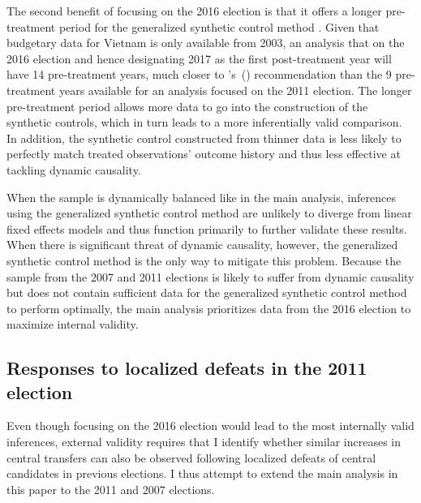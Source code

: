 \documentclass[12pt]{article}
\newcommand\citepos[1]{\citeauthor{#1}'s\ (\citeyear{#1})}
\newcommand{\1}{\mathbbm{1}}
\begin{document}
The second benefit of focusing on the 2016 election is that it offers a longer pre-treatment period for the generalized synthetic control method \citep{Xu2017gsynth}. Given that budgetary data for Vietnam is only available from 2003, an analysis that on the 2016 election and hence designating 2017 as the first post-treatment year will have 14 pre-treatment years, much closer to \citepos{Abadie2010} recommendation than the 9 pre-treatment years available for an analysis focused on the 2011 election. The longer pre-treatment period allows more data to go into the construction of the synthetic controls, which in turn leads to a more inferentially valid comparison. In addition, the synthetic control constructed from thinner data is less likely to perfectly match treated observations' outcome history and thus less effective at tackling dynamic causality.

When the sample is dynamically balanced like in the main analysis, inferences using the generalized synthetic control method are unlikely to diverge from linear fixed effects models and thus function primarily to further validate these results. When there is significant threat of dynamic causality, however, the generalized synthetic control method is the only way to mitigate this problem. Because the sample from the 2007 and 2011 elections is likely to suffer from dynamic causality but does not contain sufficient data for the generalized synthetic control method to perform optimally, the main analysis prioritizes data from the 2016 election to maximize internal validity.

\subsection{Responses to localized defeats in the 2011 election}

Even though focusing on the 2016 election would lead to the most internally valid inferences, external validity requires that I identify whether similar increases in central transfers can also be observed following localized defeats of central candidates in previous elections. I thus attempt to extend the main analysis in this paper to the 2011 and 2007 elections.
\end{document}
